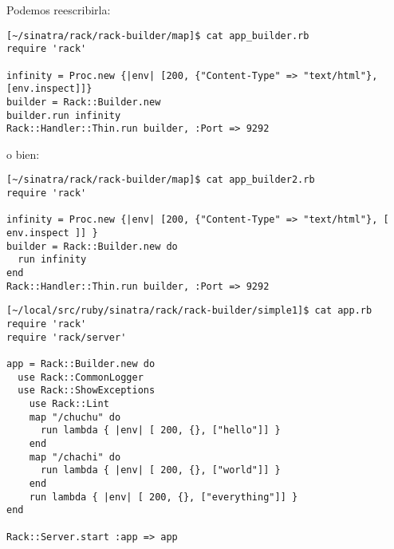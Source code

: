Podemos reescribirla:

\begin{verbatim}
[~/sinatra/rack/rack-builder/map]$ cat app_builder.rb 
require 'rack'

infinity = Proc.new {|env| [200, {"Content-Type" => "text/html"}, [env.inspect]]}
builder = Rack::Builder.new
builder.run infinity
Rack::Handler::Thin.run builder, :Port => 9292
\end{verbatim}
o bien:
\begin{verbatim}
[~/sinatra/rack/rack-builder/map]$ cat app_builder2.rb 
require 'rack'

infinity = Proc.new {|env| [200, {"Content-Type" => "text/html"}, [ env.inspect ]] }
builder = Rack::Builder.new do
  run infinity
end
Rack::Handler::Thin.run builder, :Port => 9292
\end{verbatim}


\begin{verbatim}
[~/local/src/ruby/sinatra/rack/rack-builder/simple1]$ cat app.rb 
require 'rack'
require 'rack/server'

app = Rack::Builder.new do
  use Rack::CommonLogger
  use Rack::ShowExceptions
    use Rack::Lint
    map "/chuchu" do
      run lambda { |env| [ 200, {}, ["hello"]] }
    end
    map "/chachi" do
      run lambda { |env| [ 200, {}, ["world"]] }
    end
    run lambda { |env| [ 200, {}, ["everything"]] }
end

Rack::Server.start :app => app
\end{verbatim}


